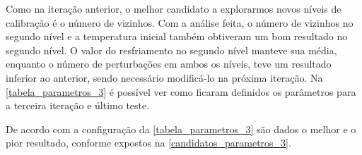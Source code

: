 \documentclass[
	12pt,				%
	twoside,			%
	a4paper,			%
	english,			%
	french,				%
	spanish,			%
	brazil				%
	]{abntex2}
\begin{document}
Como na iteração anterior, o melhor candidato a explorarmos novos níveis
de calibração é o número de vizinhos. Com a análise feita, o número de
vizinhos no segundo nível e a temperatura inicial também obtiveram um
bom resultado no segundo nível. O valor do resfriamento no segundo nível
manteve sua média, enquanto o número de perturbações em ambos os níveis,
teve um resultado inferior ao anterior, sendo necessário modificá-lo na
próxima iteração. Na \autoref{tabela_parametros_3} é possível ver como
ficaram definidos os parâmetros para a terceira iteração e último teste.

\begin{table}[ht]
    \centering
    \caption{Níveis propostos para os parâmetros do \textit{Simulated Annealing} na terceira iteração.}
    \label{tabela_parametros_3}
\end{table}

De acordo com a configuração da \autoref{tabela_parametros_3} são dados
o melhor e o pior resultado, conforme expostos na
\autoref{candidatos_parametros_3}.
\end{document}
